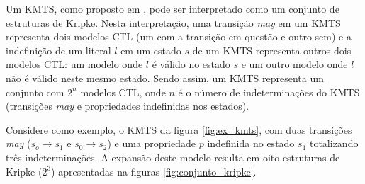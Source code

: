 \documentclass[normaltoc,capchap,capsec,times]{abnt}
\begin{document}
Um KMTS, como proposto em \cite{aline}, pode ser interpretado como um conjunto de estruturas de Kripke. Nesta interpretação, uma transição \textit{may} em um KMTS representa dois modelos CTL (um com a transição em questão e outro sem) e a indefinição de um literal $l$ em um estado $s$ de um KMTS representa outros dois modelos CTL: um modelo onde $l$ é válido no estado $s$ e um outro modelo onde $l$ não é válido neste mesmo estado. Sendo assim, um KMTS representa um conjunto  com $2^n$ modelos CTL, onde $n$ é o número de indeterminações do KMTS (transições \textit{may} e propriedades indefinidas nos estados).


Considere como exemplo, o KMTS da figura \ref{fig:ex_kmts}, com duas transições \textit{may} ($s_o \to s_1$ e $s_0 \to s_2$) e uma propriedade $p$ indefinida no estado $s_1$ totalizando três indeterminações. A expansão deste modelo resulta em oito estruturas de Kripke ($2^3$) apresentadas na figuras \ref{fig:conjunto_kripke}.
\end{document}
